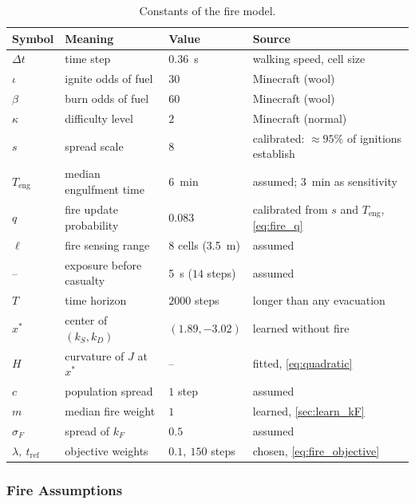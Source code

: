 \begin{table}[H]
  \centering
  \caption{Constants of the fire model.}
  \label{tab:fire_constants}
  \small
  \begin{tabular}{llll}
    \toprule
    Symbol & Meaning & Value & Source \\
    \midrule
    $\Delta t$ & time step & \SI{0.36}{s} & walking speed, cell size \\
    $\iota$ & ignite odds of fuel & $30$ & Minecraft (wool) \\
    $\beta$ & burn odds of fuel & $60$ & Minecraft (wool) \\
    $\kappa$ & difficulty level & $2$ & Minecraft (normal) \\
    $s$ & spread scale & $8$ & calibrated: $\approx 95\%$ of ignitions establish \\
    $T_{\text{eng}}$ & median engulfment time & \SI{6}{min} & assumed; \SI{3}{min} as sensitivity \\
    $q$ & fire update probability & $0.083$ & calibrated from $s$ and $T_{\text{eng}}$, \cref{eq:fire_q} \\
    $\ell$ & fire sensing range & $8$ cells (\SI{3.5}{m}) & assumed \\
    -- & exposure before casualty & \SI{5}{s} ($14$ steps) & assumed \\
    $T$ & time horizon & $2000$ steps & longer than any evacuation \\
    $x^*$ & center of $(k_S, k_D)$ & $(1.89, -3.02)$ & learned without fire %
    \\
    $H$ & curvature of $J$ at $x^*$ & -- & fitted, \cref{eq:quadratic} \\
    $c$ & population spread & $1$ step & assumed \\
    $m$ & median fire weight & $1$ & learned, \cref{sec:learn_kF} %
    \\
    $\sigma_F$ & spread of $k_F$ & $0.5$ & assumed \\
    $\lambda,\ t_{\text{ref}}$ & objective weights & $0.1,\ 150$ steps & chosen, \cref{eq:fire_objective} \\
    \bottomrule
  \end{tabular}
\end{table}

\subsubsection{Fire Assumptions}\label{sec:fire_assumptions}


